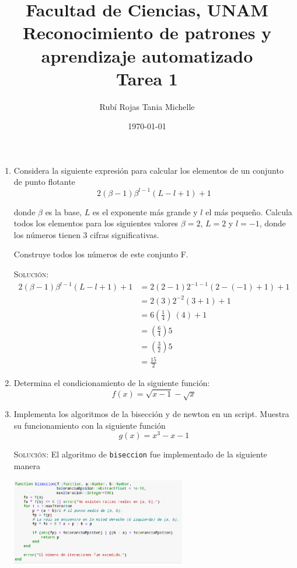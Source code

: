 \documentclass[letterpaper,11pt]{article}
\title{Facultad de Ciencias, UNAM \\ 
       Reconocimiento de patrones y aprendizaje automatizado \\ 
       Tarea 1}
\author{Rubí Rojas Tania Michelle}
\date{\today}
\begin{document}
\maketitle

\begin{enumerate}
    \item Considera la siguiente expresión para calcular los elementos de un 
    conjunto de punto flotante 
    \begin{equation*}
        2(\beta - 1) \beta^{l-1} (L - l + 1) + 1
    \end{equation*}

    donde $\beta$ es la base, $L$ es el exponente más grande y $l$ el más 
    pequeño. Calcula todos los elementos para los siguientes valores 
    $\beta = 2$, $L = 2$ y $l = -1$, donde los números tienen $3$ cifras 
    significativas.

    Construye todos los números de este conjunto F.

    \textsc{Solución:}
    \begin{align*}
        2(\beta - 1) \beta^{l-1} (L - l + 1) + 1
        &= 2(2 - 1) 2^{-1-1} (2 - (-1) + 1) + 1 \\
        &= 2(3) 2^{-2} (3 + 1) + 1 \\ 
        &= 6 \left( \frac{1}{4} \right)\ (4) + 1 \\ 
        &= \left( \frac{6}{4} \right) 5 \\ 
        &= \left( \frac{3}{2} \right) 5 \\
        &= \frac{15}{2}
    \end{align*}
    
    \item Determina el condicionamiento de la siguiente función:
    \begin{equation*}
        f(x) = \sqrt{x - 1} - \sqrt{x}
    \end{equation*}

    \item Implementa los algoritmos de la bisección y de newton en un 
    script. Muestra su funcionamiento con la siguiente función 
    \begin{equation*}
        g(x) = x^3 - x - 1
    \end{equation*}

    \textsc{Solución:} El algoritmo de \texttt{biseccion} fue implementado de 
    la siguiente manera
    \begin{center}
        \includegraphics[width=0.6\textwidth]{imagenes/biseccion.png}
    \end{center}


\end{enumerate}
\end{document}
